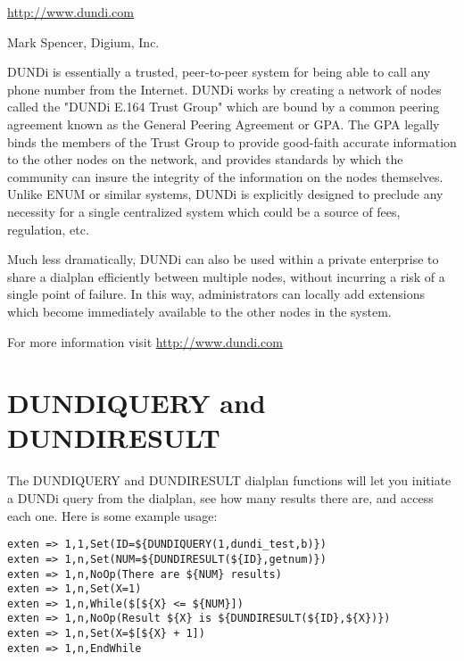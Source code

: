 \url{http://www.dundi.com}

Mark Spencer, Digium, Inc.

DUNDi is essentially a trusted, peer-to-peer system for being able to
call any phone number from the Internet.  DUNDi works by creating a
network of nodes called the "DUNDi E.164 Trust Group" which are bound by
a common peering agreement known as the General Peering Agreement or
GPA.  The GPA legally binds the members of the Trust Group to provide
good-faith accurate information to the other nodes on the network, and
provides standards by which the community can insure the integrity of
the information on the nodes themselves.  Unlike ENUM or similar
systems, DUNDi is explicitly designed to preclude any necessity for a
single centralized system which could be a source of fees, regulation,
etc.

Much less dramatically, DUNDi can also be used within a private
enterprise to share a dialplan efficiently between multiple nodes,
without incurring a risk of a single point of failure.  In this way,
administrators can locally add extensions which become immediately
available to the other nodes in the system.

For more information visit \url{http://www.dundi.com}

\section{DUNDIQUERY and DUNDIRESULT}

The DUNDIQUERY and DUNDIRESULT dialplan functions will let you initiate
a DUNDi query from the dialplan, see how many results there are, and access
each one.  Here is some example usage:
\begin{astlisting}
\begin{verbatim}
exten => 1,1,Set(ID=${DUNDIQUERY(1,dundi_test,b)})
exten => 1,n,Set(NUM=${DUNDIRESULT(${ID},getnum)})
exten => 1,n,NoOp(There are ${NUM} results)
exten => 1,n,Set(X=1)
exten => 1,n,While($[${X} <= ${NUM}])
exten => 1,n,NoOp(Result ${X} is ${DUNDIRESULT(${ID},${X})})
exten => 1,n,Set(X=$[${X} + 1])
exten => 1,n,EndWhile
\end{verbatim}
\end{astlisting}

